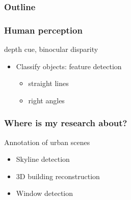 \documentclass{beamer}
\begin{document}
\frame
{
	\frametitle{Outline}
	 
}

\frame
{
	\frametitle{Human perception}
	\item  <+-| alert@+> depth cue, binocular disparity


	\begin{itemize}
	\item  <+-| alert@+> Classify objects: feature detection
		\begin{itemize}
			\item  <+-| alert@+> straight lines
			\item  <+-| alert@+> right angles 
		\end{itemize}
	\end{itemize}
}


\frame
{
	\frametitle{Where is my research about?}
	\item  <+-| alert@+>{Annotation of urban scenes}
		\begin{itemize}
			\item  <+-| alert@+> Skyline detection
			\item  <+-| alert@+> 3D building reconstruction
			\item  <+-| alert@+> Window detection
		\end{itemize}

}
\end{document}
